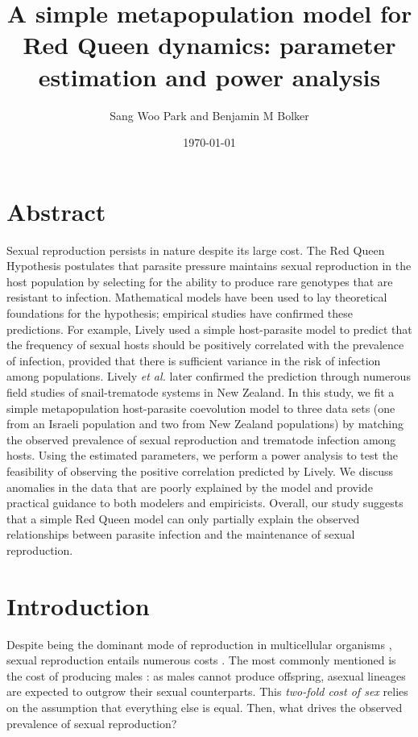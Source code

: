 \documentclass{article}\usepackage[]{graphicx}\usepackage[]{color}
\title{A simple metapopulation model for Red Queen dynamics: parameter estimation and power analysis}
\author{Sang Woo Park and Benjamin M Bolker}
\date{\today}
\begin{document}
\maketitle

\section*{Abstract}

Sexual reproduction persists in nature despite its large cost.
The Red Queen Hypothesis postulates that parasite pressure maintains sexual reproduction in the host population by selecting for the ability to produce rare genotypes that are resistant to infection.
Mathematical models have been used to lay theoretical foundations for the hypothesis; empirical studies have confirmed these predictions.
For example, Lively used a simple host-parasite model to predict that the frequency of sexual hosts should be positively correlated with the prevalence of infection, provided that there is sufficient variance in the risk of infection among populations. 
Lively \textit{et al.} later confirmed the prediction through numerous field studies of snail-trematode systems in New Zealand.
In this study, we fit a simple metapopulation host-parasite coevolution model to three data sets (one from an Israeli population and two from New Zealand populations) by matching the observed prevalence of sexual reproduction and trematode infection among hosts.
Using the estimated parameters, we perform a power analysis to test the feasibility of observing the positive correlation predicted by Lively.
We discuss anomalies in the data that are poorly explained by the model and provide practical guidance to both modelers and empiricists.
Overall, our study suggests that a simple Red Queen model can only partially explain the observed relationships between parasite infection and the maintenance of sexual reproduction.

\section{Introduction}

Despite being the dominant mode of reproduction in multicellular organisms \citep{vrijenhoek1998animal, whitton2008dynamic, otto2009evolutionary}, sexual reproduction entails numerous costs \citep{lehtonen2012many}.
The most commonly mentioned is the cost of producing males \citep{smith1978evolution}:
as males cannot produce offspring, asexual lineages are expected to outgrow their sexual counterparts.
This \emph{two-fold cost of sex} \citep{smith1978evolution} relies on the assumption that everything else is equal.
Then, what drives the observed prevalence of sexual reproduction?
\end{document}
